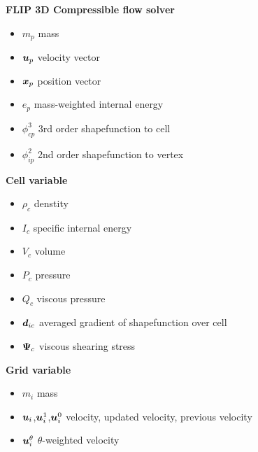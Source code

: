 \documentclass[11pt]{article}
\def\bbf#1{\mathchoice{\hbox{\boldmath$\displaystyle#1$}}
{\hbox{\boldmath$\textstyle#1$}} {\hbox{\boldmath$\scriptstyle#1$}} {\hbox{\boldmath$\scriptscriptstyle#1$}} }
\renewcommand{\mp}{m_{p}}
\newcommand{\pcp}{\phi_{cp}^3}
\newcommand{\pip}{\phi_{ip}^2}
\newcommand{\ui}{\bbf{u}_i}
\newcommand{\uiz}{\bbf{u}_i^{0}}
\newcommand{\uio}{\bbf{u}_i^{1}}
\newcommand{\uit}{\bbf{u}_i^{\theta}}
\newcommand{\up}{\bbf{u}_p}
\newcommand{\xp}{\bbf{x}_p}
\newcommand{\ep}{e_p}
\newcommand{\mi}{m_i}
\renewcommand{\mp}{m_p}
\newcommand{\rhoc}{\rho_c}
\newcommand{\Vc}{V_c}
\newcommand{\ic}{I_c}
\newcommand{\pc}{P_c}
\newcommand{\qc}{Q_c}
\newcommand{\psic}{\bbf{\Psi}_c}
\newcommand{\dic}{\bbf{d}_{ic}}
\begin{document}

\begin{center}
{\bf\Large FLIP 3D Compressible flow solver}
\end{center}

\begin{itemize}
    \item $\mp$ mass
    \item $\up$ velocity vector
    \item $\xp$ position vector
    \item $\ep$ mass-weighted internal energy
    \item $\pcp$ 3rd order shapefunction to cell
    \item $\pip$ 2nd order shapefunction to vertex
\end{itemize}
{\large \bf Cell variable} %
\begin{itemize}
    \item $\rhoc$ denstity
    \item $\ic$ specific internal energy
    \item $\Vc$ volume
    \item $\pc$ pressure
    \item $\qc$ viscous pressure
    \item $\dic$ averaged gradient of shapefunction over cell
    \item $\psic$ viscous shearing stress
\end{itemize}
{\large \bf Grid variable} %
\begin{itemize}
    \item $\mi$ mass
    \item $\ui$,$\uio$,$\uiz$ velocity, updated velocity, previous velocity
    \item $\uit$ $\theta$-weighted velocity
\end{itemize}
\end{document}
